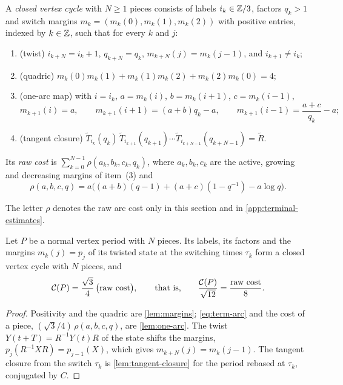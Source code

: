 \begin{definition}\label{def:term-cycle}
A \emph{closed vertex cycle} with $N\ge1$ pieces consists of labels $i_k\in\mathbb{Z}/3$, factors $q_k>1$
and switch margins $m_k=(m_k(0),m_k(1),m_k(2))$ with positive entries, indexed by $k\in\mathbb{Z}$,
such that for every $k$ and $j$:
\begin{enumerate}
\item (twist) $i_{k+N}=i_k+1$, $q_{k+N}=q_k$, $m_{k+N}(j)=m_k(j-1)$, and $i_{k+1}\ne i_k$;
\item (quadric) $m_k(0)m_k(1)+m_k(1)m_k(2)+m_k(2)m_k(0)=4$;
\item (one-arc map) with $i=i_k$, $a=m_k(i)$, $b=m_k(i+1)$, $c=m_k(i-1)$,
 \begin{equation}\label{eq:term-arc}
  m_{k+1}(i)=a,\qquad m_{k+1}(i+1)=(a+b)q_k-a,\qquad m_{k+1}(i-1)=\frac{a+c}{q_k}-a;
 \end{equation}
\item (tangent closure)
 $\widetilde T_{i_k}(q_k)\,\widetilde T_{i_{k+1}}(q_{k+1})\cdots\widetilde T_{i_{k+N-1}}(q_{k+N-1})=\widetilde R$.
\end{enumerate}
Its \emph{raw cost} is $\sum_{k=0}^{N-1}\rho(a_k,b_k,c_k,q_k)$, where $a_k,b_k,c_k$ are the
active, growing and decreasing margins of item~(3) and
\begin{equation}\label{eq:term-rawarc}
 \rho(a,b,c,q)=a\bigl((a+b)(q-1)+(a+c)(1-q^{-1})-a\log q\bigr).
\end{equation}
\end{definition}

The letter $\rho$ denotes the raw arc cost only in this section and in
\cref{app:terminal-estimates}.

\begin{lemma}\label{lem:term-cycle}
Let $P$ be a normal vertex period with $N$ pieces. Its labels, its factors and the margins
$m_k(j)=p_j$ of its twisted state at the switching times $\tau_k$ form a closed vertex cycle with
$N$ pieces, and
\[
 \mathcal{C}(P)=\frac{\sqrt3}{4}\,\bigl(\text{raw cost}\bigr),\qquad\text{that is,}\qquad
 \frac{\mathcal{C}(P)}{\sqrt{12}}=\frac{\text{raw cost}}{8}.
\]
\end{lemma}

\begin{proof}
Positivity and the quadric are \cref{lem:margins}; \eqref{eq:term-arc} and the cost of a piece,
$(\sqrt3/4)\,\rho(a,b,c,q)$, are \cref{lem:one-arc}. The twist $Y(t+T)=R^{-1}Y(t)R$ of the state
shifts the margins, $p_j(R^{-1}XR)=p_{j-1}(X)$, which gives $m_{k+N}(j)=m_k(j-1)$. The tangent
closure from the switch $\tau_k$ is \cref{lem:tangent-closure} for the period rebased at
$\tau_k$, conjugated by $C$.
\end{proof}

